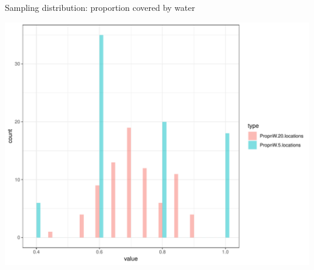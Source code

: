 \documentclass[handout]{beamer}\usepackage[]{graphicx}\usepackage[]{color}
\newenvironment{knitrout}{}{} %
\begin{document}
\begin{frame}[fragile]{Sampling distribution: proportion covered by water}




\begin{knitrout}\scriptsize
{}\color{fgcolor}

{\centering \includegraphics[width=1\linewidth]{figure/unnamed-chunk-4-1} 

}



\end{knitrout}

\end{frame}
\end{document}
